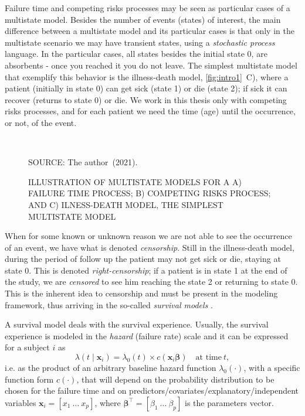 Failure time and competing risks processes may be seen as particular
cases of a multistate model. Besides the number of events (states) of
interest, the main difference between a multistate model and its
particular cases is that only in the multistate scenario we may have
transient states, using a \textit{stochastic process} language. In the
particular cases, all states besides the initial state 0, are absorbents
- once you reached it you do not leave. The simplest multistate model
that exemplify this behavior is the illness-death model,
\autoref{fig:intro1}~C), where a patient (initially in state 0) can get
sick (state 1) or die (state 2); if sick it can recover (returns to
state 0) or die. We work in this thesis only with competing risks
processes, and for each patient we need the time (age) until the
occurrence, or not, of the event.

\begin{figure}[H]
 \setlength{\abovecaptionskip}{.0001pt}
 \caption{ILLUSTRATION OF MULTISTATE MODELS FOR A A) FAILURE TIME
          PROCESS; B) COMPETING RISKS PROCESS; AND C) ILNESS-DEATH
          MODEL, THE SIMPLEST MULTISTATE MODEL}
 \vspace{0.5cm}\centering
 \\
 \vspace{0.5cm}
 \begin{footnotesize}
  SOURCE: The author~(2021).
 \end{footnotesize}
 \label{fig:intro1}
\end{figure}

When for some known or unknown reason we are not able to see the
occurrence of an event, we have what is denoted \textit{censorship}.
Still in the illness-death model, during the period of follow up the
patient may not get sick or die, staying at state 0. This is denoted
\textit{right-censorship}; if a patient is in state 1 at the end of the
study, we are \textit{censored} to see him reaching the state 2 or
returning to state 0. This is the inherent idea to censorship and must
be present in the modeling framework, thus arriving in the so-called
\textit{survival models} \cite{kalb&prentice}.

A survival model deals with the survival experience. Usually, the
survival experience is modeled in the \textit{hazard} (failure rate)
scale and it can be expressed for a subject \(i\) as
\begin{equation}
  \lambda(t \mid \bm{x}_{i}) =
  \lambda_{0}(t) \times c(\bm{x}_{i} \bm{\beta})
  \quad \text{at time}~t,
  \label{eq:intro1}
\end{equation}
i.e. as the product of an arbitrary baseline hazard function
\(\lambda_{0}(\cdot)\), with a specific function form \(c(\cdot)\), that
will depend on the probability distribution to be chosen for the failure
time and on predictors/covariates/explanatory/independent variables
\(\bm{x}_{i} = [x_{1}~\dots~x_{p}]\), where \(\bm{\beta}^{\top} =
[\beta_{1}~\dots~\beta_{p}]\) is the parameters vector.

